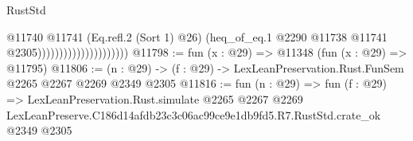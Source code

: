 \begin{lexlean}{RustStd}
\begin{coremodule}
                                          @11740
                                            @11741
                                            (Eq.refl.{2} (Sort 1) @26)
                                            (heq_of_eq.{1}
                                              @2290
                                              @11738
                                              @11741
                                              @2305)))))))))))))))))))))
@11798 := fun (x : @29) => @11348 (fun (x : @29) => @11795)
@11806 := (n : @29) -> (f : @29) -> LexLeanPreservation.Rust.FunSem @2265 @2267 @2269 @2349 @2305
@11816 := fun (n : @29) =>
  fun (f : @29) =>
  LexLeanPreservation.Rust.simulate
    @2265
    @2267
    @2269
    LexLeanPreserve.C186d14afdb23c3c06ac99ce9e1db9fd5.R7.RustStd.crate_ok
    @2349
    @2305
\end{coremodule}
\end{lexlean}
